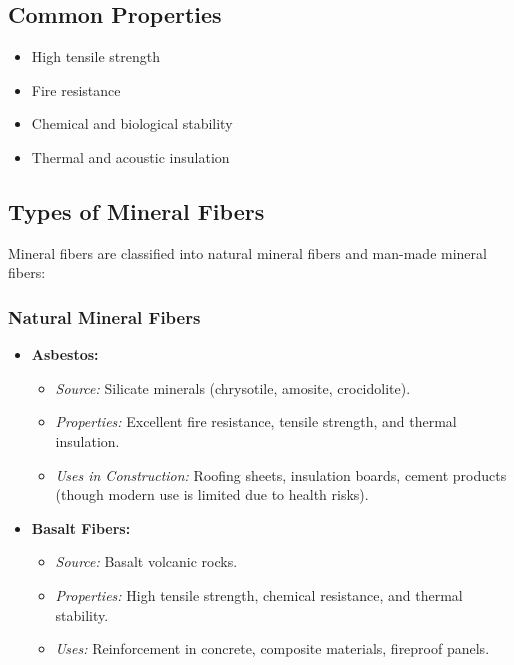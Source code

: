 \documentclass[12pt,a4paper]{article}
\begin{document}
\subsection{Common Properties}
\begin{itemize}
    \item High tensile strength
    \item Fire resistance
    \item Chemical and biological stability
    \item Thermal and acoustic insulation
\end{itemize}

\subsection{Types of Mineral Fibers}
Mineral fibers are classified into natural mineral fibers and man-made mineral fibers:

\subsubsection{Natural Mineral Fibers}
\begin{itemize}
    \item \textbf{Asbestos:}
    \begin{itemize}
        \item \textit{Source:} Silicate minerals (chrysotile, amosite, crocidolite).
        \item \textit{Properties:} Excellent fire resistance, tensile strength, and thermal insulation.
        \item \textit{Uses in Construction:} Roofing sheets, insulation boards, cement products (though modern use is limited due to health risks).
    \end{itemize}
    \item \textbf{Basalt Fibers:}
    \begin{itemize}
        \item \textit{Source:} Basalt volcanic rocks.
        \item \textit{Properties:} High tensile strength, chemical resistance, and thermal stability.
        \item \textit{Uses:} Reinforcement in concrete, composite materials, fireproof panels.
    \end{itemize}
\end{itemize}
\end{document}
